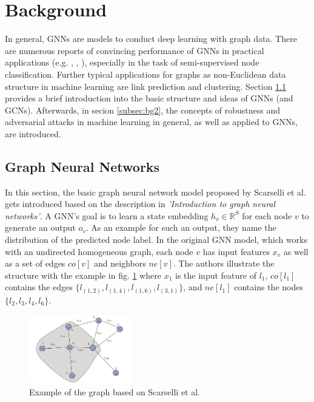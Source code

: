\documentclass[a4paper,preprint]{sig-alternate}
\begin{document}
\vfill
\pagebreak

\section{Background}
\label{sec:background}

In general, GNNs are models to conduct deep learning with graph data.
There are numerous reports of convincing performance of GNNs in practical applications (e.g. \cite{NIPS2015_f9be311e},
\cite{hamilton2018inductive}, \cite{trivedi2017knowevolve}), especially in the task of semi-supervised node classification. \cite{xu2019topology}
Further typical applications for graphs as non-Euclidean data structure in machine learning are link prediction and clustering. \cite{Zhou_2019}
Section \ref{subsec:bg1} provides a brief introduction into the basic structure and ideas of GNNs (and GCNs). Afterwards, in secion
\ref{subsec:bg2}, the concepts of robustness and adversarial attacks in machine learning in general, as well as applied to GNNs, are introduced.\newline

\subsection{Graph Neural Networks}
\label{subsec:bg1}

In this section, the basic graph neural network model proposed by Scarselli et al. \cite{Scarselli_2009} gets introduced
based on the description in \textit{'Introduction to graph neural networks'}\cite{Liu_2020}.
A GNN's goal is to learn a state embedding $h_v \in \mathbb{R}^S$ for each node $v$ to generate an output $o_v$.
As an example for such an output, they name the distribution of the predicted node label.
In the original GNN model, which works with an undirected homogeneous graph, each node $v$ has input features $x_v$
as well as a set of edges $co[v]$ and neighbors $ne[v]$. 
The authors illustrate the structure with the example in fig. \ref{fig:graph}
where $x_{1}$ is the input feature of $l_1$, $co[l_1]$ contains the edges $\{l_{(1, 2)}, l_{(1, 4)}, l_{(1, 6)}, l_{(3, 1)}\}$, and 
$ne[l_1]$ contains the nodes $\{l_2, l_3, l_4, l_6\}$.

\begin{figure}[h]
    \centering
    \includegraphics[width=0.4\textwidth]{img/graph.png}
    \caption{Example of the graph based on Scarselli et al. \cite{Liu_2020}}
    \label{fig:graph}
\end{figure}
\end{document}
